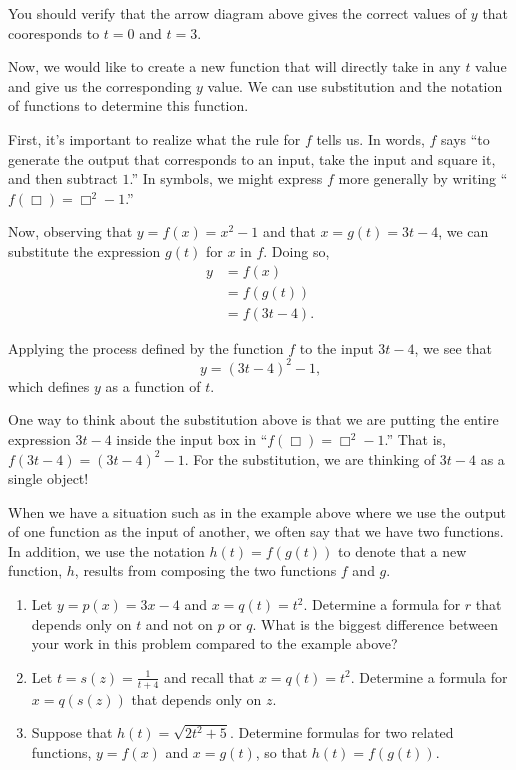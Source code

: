 \documentclass{ximera}
\begin{document}
\begin{example}
\begin{explanation}
You should verify that the arrow diagram above gives the correct values of $y$ that cooresponds to $t=0$ and $t=3$.

Now, we would like to create a new function that will directly take in any $t$ value and give us the corresponding $y$ value.  We can use substitution and the notation of functions to determine this function.

First, it's important to realize what the rule for \(f\) tells us.  In words, \(f\) says ``to generate the output that corresponds to an input, take the input and square it, and then subtract \(1\).''  In symbols, we might express \(f\) more generally by writing ``\(f(\Box) = \Box^2 - 1\).''

Now, observing that \(y = f(x) = x^2 - 1\) and that \(x = g(t) = 3t - 4\), we can substitute the expression \(g(t)\) for \(x\) in \(f\).  Doing so,%
\begin{align*}
y &= f(x)\\
&= f(g(t))\\
&= f(3t-4)\text{.}
\end{align*}

Applying the process defined by the function \(f\) to the input \(3t-4\), we see that%
\begin{equation*}
y = (3t-4)^2 - 1\text{,}
\end{equation*}
which defines \(y\) as a function of \(t\).

One way to think about the substitution above is that we are putting the entire expression $3t-4$ inside the input box in ``\(f(\Box) = \Box^2 - 1\).''   That is, $f \left( \boxed{3t-4} \right) = \left( \boxed{3t-4} \right) ^2 -1$.  For the substitution, we are thinking of $3t-4$ as a single object! 

\end{explanation}
\end{example}

When we have a situation such as in the example above where we use the output of one function as the input of another, we often say that we have  two functions.  In addition, we use the notation \(h(t) = f(g(t))\) to denote that a new function, \(h\), results from composing the two functions \(f\) and \(g\).


\begin{exploration}
\begin{enumerate}[label=\alph*.]
\item Let \(y = p(x) = 3x - 4\) and \(x = q(t) = t^2\).   Determine a formula for \(r\) that depends only on \(t\) and not on \(p\) or \(q\).  What is the biggest difference between your work in this problem compared to the example above?
\item Let \(t = s(z) = \frac{1}{t+4}\) and recall that \(x = q(t) = t^2\).  Determine a formula for \(x = q(s(z))\) that depends only on \(z\).
\item Suppose that \(h(t) = \sqrt{2t^2 + 5}\).  Determine formulas for two related functions, \(y = f(x)\) and \(x = g(t)\), so that \(h(t) = f(g(t))\).
\end{enumerate}
\end{exploration}
\end{document}
